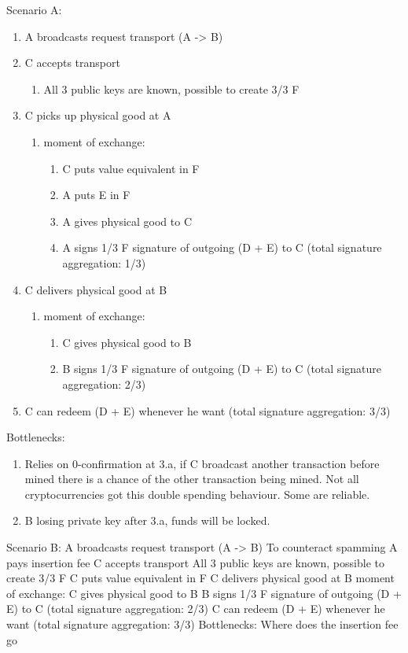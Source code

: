 \documentclass[Nomencl]{DylanMaster}
\begin{document}
Scenario A:
\begin{enumerate}
  \item A broadcasts request transport (A -> B)
  \item C accepts transport
  \begin{enumerate}
    \item All 3 public keys are known, possible to create 3/3 F
  \end{enumerate}
  \item C picks up physical good at A
  \begin{enumerate}
    \item moment of exchange:
    \begin{enumerate}
      \item C puts value equivalent in F
      \item A puts E in F
      \item A gives physical good to C
      \item A signs 1/3 F signature of outgoing (D + E) to C (total signature aggregation: 1/3)
    \end{enumerate}
  \end{enumerate}
  \item C delivers physical good at B
  \begin{enumerate}
    \item moment of exchange:
    \begin{enumerate}
      \item C gives physical good to B
      \item B signs 1/3 F signature of outgoing (D + E) to C (total signature aggregation: 2/3)
    \end{enumerate}
  \end{enumerate}
  \item C can redeem (D + E) whenever he want (total signature aggregation: 3/3)
\end{enumerate}

Bottlenecks:
\begin{enumerate}
  \item Relies on 0-confirmation at 3.a, if C broadcast another transaction before mined there is a chance of the other transaction being mined. Not all cryptocurrencies got this double spending behaviour. Some are reliable.
  \item B losing private key after 3.a, funds will be locked.
\end{enumerate}

Scenario B:
A broadcasts request transport (A -> B)
To counteract spamming
A pays insertion fee
C accepts transport
All 3 public keys are known, possible to create 3/3 F
C puts value equivalent in F
C delivers physical good at B
moment of exchange:
C gives physical good to B
B signs 1/3 F signature of outgoing (D + E) to C (total signature aggregation: 2/3)
C can redeem (D + E) whenever he want (total signature aggregation: 3/3)
Bottlenecks:
Where does the insertion fee go
\end{document}
